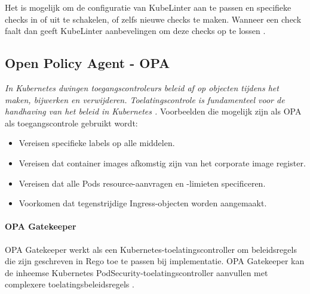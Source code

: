 Het is mogelijk om de configuratie van KubeLinter aan te passen en specifieke checks in of uit te schakelen, of zelfs nieuwe checks te maken. Wanneer een check faalt dan geeft KubeLinter aanbevelingen om deze checks op te lossen \autocite{KubeLinterDocs}. 

\subsection{Open Policy Agent - OPA}
\textit{In Kubernetes dwingen toegangscontroleurs beleid af op objecten tijdens het maken, bijwerken en verwijderen. Toelatingscontrole is fundamenteel voor de handhaving van het beleid in Kubernetes \autocite{OPAdocs-2023}.} 
Voorbeelden die mogelijk zijn als OPA als toegangscontrole gebruikt wordt:
\begin{itemize}
    \item Vereisen specifieke labels op alle middelen.
    \item Vereisen dat container images afkomstig zijn van het corporate image register.
    \item Vereisen dat alle Pods resource-aanvragen en -limieten specificeren.
    \item Voorkomen dat tegenstrijdige Ingress-objecten worden aangemaakt.
\end{itemize}

\paragraph{OPA Gatekeeper}
OPA Gatekeeper werkt als een Kubernetes-toelatingscontroller om beleidsregels die zijn geschreven in Rego toe te passen bij implementatie. OPA Gatekeeper kan de inheemse Kubernetes PodSecurity-toelatingscontroller aanvullen met complexere toelatingsbeleidsregels \autocite{RedHat-SupplyChainSec-2022}. 


